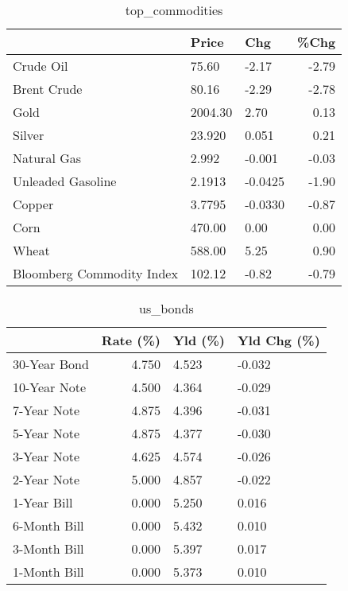 \documentclass{article}%
\begin{document}
\begin{table}[htbp]%
\caption{top\_commodities}%
\centering%
\begin{adjustbox}{width=1\textwidth}%
\begin{tabular}{lllr}
\toprule
                          &   Price &     Chg &  \%Chg \\
\midrule
               Crude Oil  &   75.60 &   -2.17 & -2.79 \\
             Brent Crude  &   80.16 &   -2.29 & -2.78 \\
                    Gold  & 2004.30 &    2.70 &  0.13 \\
                  Silver  &  23.920 &   0.051 &  0.21 \\
             Natural Gas  &   2.992 &  -0.001 & -0.03 \\
       Unleaded Gasoline  &  2.1913 & -0.0425 & -1.90 \\
                  Copper  &  3.7795 & -0.0330 & -0.87 \\
                    Corn  &  470.00 &    0.00 &  0.00 \\
                   Wheat  &  588.00 &    5.25 &  0.90 \\
Bloomberg Commodity Index &  102.12 &   -0.82 & -0.79 \\
\bottomrule
\end{tabular}
%
\end{adjustbox}%
\end{table}

%


\begin{table}[htbp]%
\caption{us\_bonds}%
\centering%
\begin{adjustbox}{width=1\textwidth}%
\begin{tabular}{lrll}
\toprule
             &  Rate (\%) & Yld (\%) & Yld Chg (\%) \\
\midrule
30-Year Bond &     4.750 &   4.523 &      -0.032 \\
10-Year Note &     4.500 &   4.364 &      -0.029 \\
 7-Year Note &     4.875 &   4.396 &      -0.031 \\
 5-Year Note &     4.875 &   4.377 &      -0.030 \\
 3-Year Note &     4.625 &   4.574 &      -0.026 \\
 2-Year Note &     5.000 &   4.857 &      -0.022 \\
 1-Year Bill &     0.000 &   5.250 &       0.016 \\
6-Month Bill &     0.000 &   5.432 &       0.010 \\
3-Month Bill &     0.000 &   5.397 &       0.017 \\
1-Month Bill &     0.000 &   5.373 &       0.010 \\
\bottomrule
\end{tabular}
%
\end{adjustbox}%
\end{table}
\end{document}

